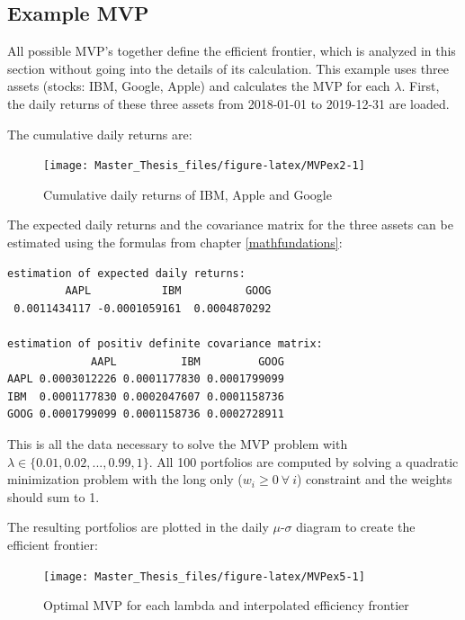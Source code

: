 \documentclass[
  oneside, a4paper, 12pt, openany]{book}
\theoremstyle{definition}
\theoremstyle{definition}
\theoremstyle{definition}
\theoremstyle{definition}
\theoremstyle{remark}
\begin{document}
\hypertarget{example-mvp}{%
\subsection{Example MVP}\label{example-mvp}}

All possible MVP's together define the efficient frontier, which is analyzed in this section without going into the details of its calculation. This example uses three assets (stocks: IBM, Google, Apple) and calculates the MVP for each \(\lambda\). First, the daily returns of these three assets from 2018-01-01 to 2019-12-31 are loaded.

The cumulative daily returns are:

\begin{figure}[H]
\texttt{[image: Master\_Thesis\_files/figure-latex/MVPex2-1]} \caption{Cumulative daily returns of IBM, Apple and Google}\label{fig:MVPex2}
\end{figure}

The expected daily returns and the covariance matrix for the three assets can be estimated using the formulas from chapter \ref{mathfundations}:

\vspace{0.1cm}\fontsize{11}{12}\selectfont

\begin{verbatim}
estimation of expected daily returns:
         AAPL           IBM          GOOG 
 0.0011434117 -0.0001059161  0.0004870292 

estimation of positiv definite covariance matrix:
             AAPL          IBM         GOOG
AAPL 0.0003012226 0.0001177830 0.0001799099
IBM  0.0001177830 0.0002047607 0.0001158736
GOOG 0.0001799099 0.0001158736 0.0002728911
\end{verbatim}

\normalsize\vspace{0.1cm}

This is all the data necessary to solve the MVP problem with \(\lambda \in \{0.01, 0.02, ..., 0.99, 1\}\). All 100 portfolios are computed by solving a quadratic minimization problem with the long only (\(w_i \geq 0 \ \forall \ i\)) constraint and the weights should sum to 1.

The resulting portfolios are plotted in the daily \(\mu\)-\(\sigma\) diagram to create the efficient frontier:

\begin{figure}[H]
\texttt{[image: Master\_Thesis\_files/figure-latex/MVPex5-1]} \caption{Optimal MVP for each lambda and interpolated efficiency frontier}\label{fig:MVPex5}
\end{figure}
\end{document}
